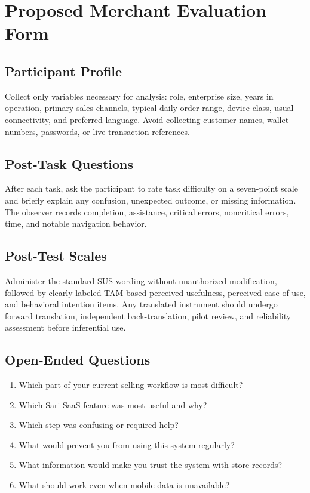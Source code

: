 \documentclass[12pt,oneside]{report}
\begin{document}
\chapter{Proposed Merchant Evaluation Form}
\section*{Participant Profile}
Collect only variables necessary for analysis: role, enterprise size, years in
operation, primary sales channels, typical daily order range, device class,
usual connectivity, and preferred language. Avoid collecting customer names,
wallet numbers, passwords, or live transaction references.

\section*{Post-Task Questions}
After each task, ask the participant to rate task difficulty on a seven-point
scale and briefly explain any confusion, unexpected outcome, or missing
information. The observer records completion, assistance, critical errors,
noncritical errors, time, and notable navigation behavior.

\section*{Post-Test Scales}
Administer the standard SUS wording without unauthorized modification, followed
by clearly labeled TAM-based perceived usefulness, perceived ease of use, and
behavioral intention items. Any translated instrument should undergo forward
translation, independent back-translation, pilot review, and reliability
assessment before inferential use.

\section*{Open-Ended Questions}
\begin{enumerate}
  \item Which part of your current selling workflow is most difficult?
  \item Which Sari-SaaS feature was most useful and why?
  \item Which step was confusing or required help?
  \item What would prevent you from using this system regularly?
  \item What information would make you trust the system with store records?
  \item What should work even when mobile data is unavailable?
\end{enumerate}
\end{document}
